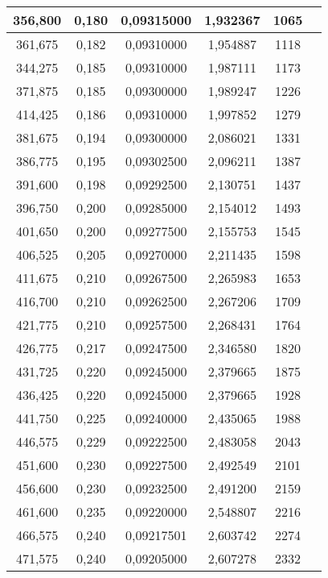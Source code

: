 \documentclass[a4paper,12pt]{article}
\numberwithin{equation}{section}
\begin{document}
\begin{appendices}
\begin{longtable}[c]{|c|c|c|c|c|c|}
356,800	&	 		0,180	&	 		0,09315000		 	&	1,932367	&	 		1065		\\\hline
361,675	&	 		0,182	&	 		0,09310000		 	&	1,954887	&	 		1118		\\\hline
344,275	&	 		0,185	&	 		0,09310000		 	&	1,987111	&	 		1173		\\\hline
371,875	&	 		0,185	&	 		0,09300000		 	&	1,989247	&	 		1226		\\\hline
414,425	&	 		0,186	&	 		0,09310000		 	&	1,997852	&	 		1279		\\\hline
381,675	&	 		0,194	&	 		0,09300000		 	&	2,086021	&	 		1331		\\\hline
386,775	&	 		0,195	&	 		0,09302500		 	&	2,096211	&	 		1387		\\\hline
391,600	&	 		0,198	&	 		0,09292500		 	&	2,130751	&	 		1437		\\\hline
396,750	&	 		0,200	&	 		0,09285000		 	&	2,154012	&	 		1493		\\\hline
401,650	&	 		0,200	&	 		0,09277500		 	&	2,155753	&	 		1545		\\\hline
406,525	&	 		0,205	&	 		0,09270000		 	&	2,211435	&	 		1598		\\\hline
411,675	&	 		0,210	&	 		0,09267500		 	&	2,265983	&	 		1653		\\\hline
416,700	&	 		0,210	&	 		0,09262500		 	&	2,267206	&	 		1709		\\\hline
421,775	&	 		0,210	&	 		0,09257500		 	&	2,268431	&	 		1764		\\\hline
426,775	&	 		0,217	&	 		0,09247500		 	&	2,346580	&	 		1820		\\\hline
431,725	&	 		0,220	&	 		0,09245000		 	&	2,379665	&	 		1875		\\\hline
436,425	&	 		0,220	&	 		0,09245000		 	&	2,379665	&	 		1928		\\\hline
441,750	&	 		0,225	&	 		0,09240000		 	&	2,435065	&	 		1988		\\\hline
446,575	&	 		0,229	&	 		0,09222500		 	&	2,483058	&	 		2043		\\\hline
451,600	&	 		0,230	&	 		0,09227500		 	&	2,492549	&	 		2101		\\\hline
456,600	&	 		0,230	&	 		0,09232500		 	&	2,491200	&	 		2159		\\\hline
461,600	&	 		0,235	&	 		0,09220000		 	&	2,548807	&	 		2216		\\\hline
466,575	&	 		0,240	&	 		0,09217501		 	&	2,603742	&	 		2274		\\\hline
471,575	&	 		0,240	&	 		0,09205000		 	&	2,607278	&	 		2332		\\\hline

\end{longtable}
\end{appendices}
\end{document}
